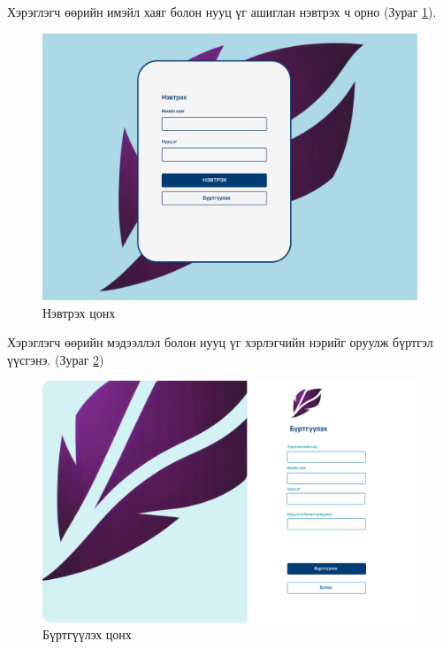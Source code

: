\noindent Хэрэглэгч өөрийн имэйл хаяг болон нууц үг ашиглан нэвтрэх ч орно (Зураг \ref{fig:login}). 
\begin{figure}[H]
    \centering
    \includegraphics[scale=0.25]{Figures/ui/login.png}
    \caption{Нэвтрэх цонх}
    \label{fig:login}
\end{figure}

\noindent Хэрэглэгч өөрийн мэдээллэл болон нууц үг хэрлэгчийн нэрийг оруулж бүртгэл үүсгэнэ. (Зураг \ref{fig:register})
\begin{figure}[H]
    \centering
    \includegraphics[scale=0.35]{Figures/ui/register.png}
    \caption{Бүртгүүлэх цонх}
    \label{fig:register}
\end{figure}

